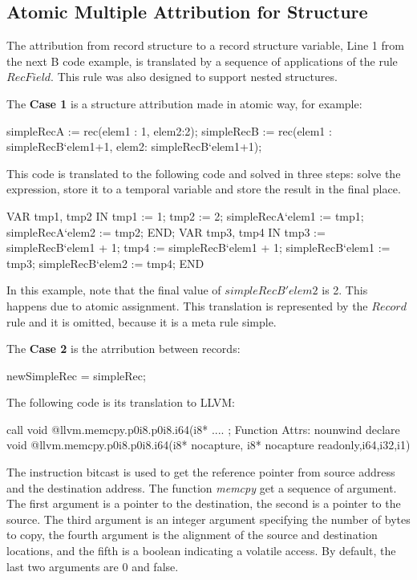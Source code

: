 \documentclass{llncs}
\begin{document}
\subsection{Atomic Multiple Attribution for Structure }
The attribution from record structure to a record structure variable, Line 1 
from the next B code example, is translated by a sequence of applications of
the  rule $RecField$. This rule was also designed to support nested structures.

The \textbf{Case 1} is a structure attribution made in atomic way, for example:

\begin{pascalcode}
simpleRecA := rec(elem1 : 1, elem2:2);
simpleRecB := rec(elem1 : simpleRecB`elem1+1, elem2: simpleRecB`elem1+1);
\end{pascalcode}

This code is translated to the following code and solved in three steps: solve
the expression, store it to a temporal variable and store the result in the
final place.

\begin{pascalcode}
VAR tmp1, tmp2 IN
tmp1 := 1;
tmp2 := 2;
simpleRecA`elem1 := tmp1;
simpleRecA`elem2 := tmp2;
END;
VAR tmp3, tmp4 IN
tmp3 := simpleRecB`elem1 + 1;
tmp4 := simpleRecB`elem1 + 1;
simpleRecB`elem1 := tmp3;
simpleRecB`elem2 := tmp4;
END
\end{pascalcode}

In this example, note that the final value of $simpleRecB'elem2$ is 2. This 
happens due to atomic assignment. This translation is represented by the 
$Record$ rule and it is omitted, because it is a meta rule simple.

The \textbf{Case 2} is the atrribution between records:

\begin{pascalcode}
  newSimpleRec = simpleRec;
\end{pascalcode}

The following code is its translation to LLVM:

\begin{llvmcode}
call void @llvm.memcpy.p0i8.p0i8.i64(i8* %
....
; Function Attrs: nounwind
declare void @llvm.memcpy.p0i8.p0i8.i64(i8* nocapture, i8* nocapture readonly,i64,i32,i1)
\end{llvmcode}

The instruction bitcast is used to get the reference pointer from source address 
and the destination address. The function \textit{memcpy} get a sequence of argument.
The first argument is a pointer to the destination, the second is a pointer to the source.
The third argument is an integer argument specifying the number of bytes to copy, the
fourth argument is the alignment of the source and destination locations, and the fifth
is a boolean indicating a volatile access. By default, the last two arguments are 0 and false.
\end{document}
